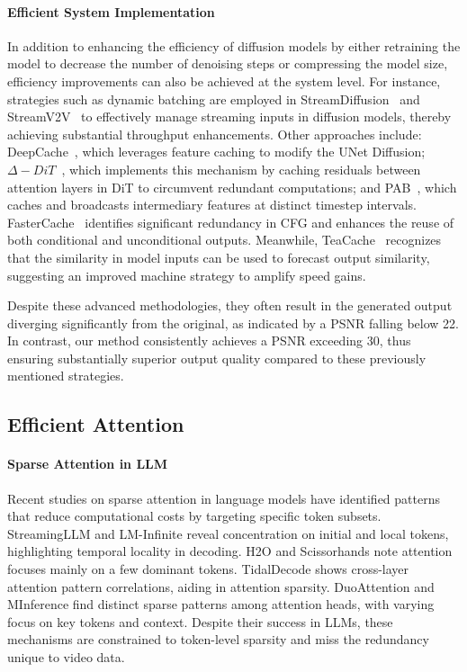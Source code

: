 \paragraph{Efficient System Implementation}
In addition to enhancing the efficiency of diffusion models by either retraining the model to decrease the number of denoising steps or compressing the model size, efficiency improvements can also be achieved at the system level. For instance, strategies such as dynamic batching are employed in StreamDiffusion~\citep{kodaira2023streamdiffusion} and StreamV2V~\citep{liang2024looking} to effectively manage streaming inputs in diffusion models, thereby achieving substantial throughput enhancements. Other approaches include: DeepCache~\citep{ma2024deepcache}, which leverages feature caching to modify the UNet Diffusion; $\Delta-DiT$~\citep{chen2024delta}, which implements this mechanism by caching residuals between attention layers in DiT to circumvent redundant computations; and PAB~\citep{zhao2024pab}, which caches and broadcasts intermediary features at distinct timestep intervals. FasterCache~\citep{lv2024fastercache} identifies significant redundancy in CFG and enhances the reuse of both conditional and unconditional outputs. Meanwhile, TeaCache~\cite{liu2024timestep} recognizes that the similarity in model inputs can be used to forecast output similarity, suggesting an improved machine strategy to amplify speed gains.

Despite these advanced methodologies, they often result in the generated output diverging significantly from the original, as indicated by a PSNR falling below 22. In contrast, our method consistently achieves a PSNR exceeding 30, thus ensuring substantially superior output quality compared to these previously mentioned strategies.

\subsection{Efficient Attention}


\paragraph{Sparse Attention in LLM} Recent studies on sparse attention in language models have identified patterns that reduce computational costs by targeting specific token subsets. StreamingLLM \cite{xiao2023efficient} and LM-Infinite \cite{han2023lm} reveal concentration on initial and local tokens, highlighting temporal locality in decoding. H2O \cite{zhang2023h2o} and Scissorhands \cite{liu2024scissorhands} note attention focuses mainly on a few dominant tokens. TidalDecode \cite{yang2024tidaldecode} shows cross-layer attention pattern correlations, aiding in attention sparsity. DuoAttention \cite{xiao2024duoattention} and MInference \cite{jiang2024minference} find distinct sparse patterns among attention heads, with varying focus on key tokens and context. Despite their success in LLMs, these mechanisms are constrained to token-level sparsity and miss the redundancy unique to video data.

